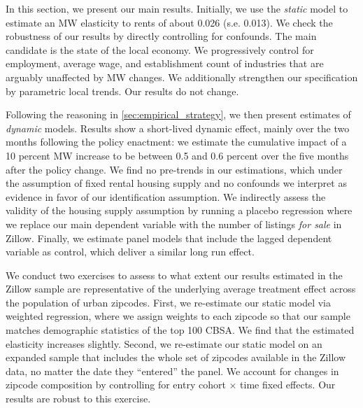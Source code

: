 
In this section, we present our main results. Initially, we use the \textit{static} model
to estimate an MW elasticity to rents of about 0.026 (s.e. 0.013). We check the
robustness of our results by directly controlling for confounds. The main candidate is 
the state of the local economy. We progressively control for employment, average wage, 
and establishment count of industries that are arguably unaffected by MW changes. 
We additionally strengthen our specification by  parametric local trends. Our results do not 
change.

Following the reasoning in \autoref{sec:empirical_strategy}, we then present estimates of 
\textit{dynamic} models. Results show a short-lived dynamic effect, mainly over the two
months following the policy enactment: we estimate the cumulative impact of a 10 percent MW increase 
to be between 0.5 and 0.6 percent over the five months after the policy change. 
We find no pre-trends in our estimations, which under the assumption of fixed rental housing 
supply and no confounds we interpret as evidence in favor of our identification assumption. 
We indirectly assess the validity of the housing supply assumption by running a placebo 
regression where we replace our main dependent variable with the number of listings \textit{for sale} in Zillow. 
Finally, we estimate panel models that include the lagged dependent variable as control,
which deliver a similar long run effect.







We conduct two exercises to assess to what extent our results estimated in the Zillow sample 
are representative of the underlying average treatment effect across the population of urban
zipcodes. First, we re-estimate our static model via weighted regression, where we assign weights 
to each zipcode so that our sample matches demographic statistics of the top 100 
CBSA. We find that the estimated elasticity increases slightly. Second, we 
re-estimate our static model on an expanded sample that includes the whole set of zipcodes 
available in the Zillow data, no matter the date they ``entered'' the panel. We account for 
changes in zipcode composition by controlling for entry cohort $\times$ time fixed effects. 
Our results are robust to this exercise.

